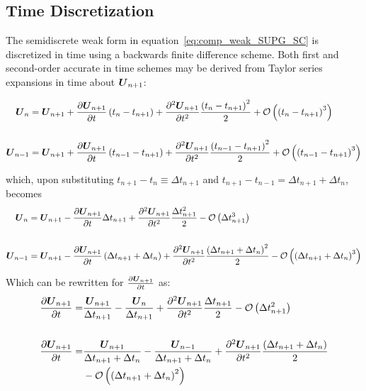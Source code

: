 \documentclass[compress,11pt]{beamer}
\begin{document}
\subsection{Time Discretization}
\frame
{
  \scriptsize
  The semidiscrete weak form in equation~\eqref{eq:comp_weak_SUPG_SC} is discretized in time using a backwards finite difference scheme.  Both first and second-order accurate in time schemes may be derived from Taylor series expansions in time about ${\boldsymbol{U}}_{n+1}$:
  
  {
    \begin{align}
      {\boldsymbol{U}}_n     = {\boldsymbol{U}}_{n+1} &+ {\frac{\partial{{\boldsymbol{U}}_{n+1}}}{\partial{t}}}\left(t_n-t_{n+1}\right) + {\frac{{\partial}^2{{\boldsymbol{U}}_{n+1}}}{\partial{t}^2}}\frac{\left(t_n-t_{n+1}\right)^2}{2} + \mathcal{O}\left(\left(t_n-t_{n+1}\right)^3\right) \nonumber \\
      & \nonumber \\
      {\boldsymbol{U}}_{n-1} = {\boldsymbol{U}}_{n+1} &+ {\frac{\partial{{\boldsymbol{U}}_{n+1}}}{\partial{t}}}\left(t_{n-1}-t_{n+1}\right) + {\frac{{\partial}^2{{\boldsymbol{U}}_{n+1}}}{\partial{t}^2}}\frac{\left(t_{n-1}-t_{n+1}\right)^2}{2} \nonumber + \mathcal{O}\left(\left(t_{n-1}-t_{n+1}\right)^3\right) \nonumber
    \end{align}
  }
      
  {
    which, upon substituting $t_{n+1} - t_n\equiv\Delta t_{n+1}$ and $t_{n+1} - t_{n-1}=\Delta t_{n+1} + \Delta t_n$, becomes
    \begin{align}
      {\boldsymbol{U}}_n     = {\boldsymbol{U}}_{n+1} &- {\frac{\partial{{\boldsymbol{U}}_{n+1}}}{\partial{t}}}\Delta t_{n+1} + {\frac{{\partial}^2{{\boldsymbol{U}}_{n+1}}}{\partial{t}^2}}\frac{\Delta t_{n+1}^2}{2} - \mathcal{O}\left(\Delta t_{n+1}^3\right) \nonumber \\ 
      & \nonumber \\
      {\boldsymbol{U}}_{n-1} = {\boldsymbol{U}}_{n+1} &- {\frac{\partial{{\boldsymbol{U}}_{n+1}}}{\partial{t}}}\left(\Delta t_{n+1}+\Delta t_n\right) + {\frac{{\partial}^2{{\boldsymbol{U}}_{n+1}}}{\partial{t}^2}}\frac{\left(\Delta t_{n+1}+\Delta t_n\right)^2}{2} - \mathcal{O}\left(\left(\Delta t_{n+1}+\Delta t_n\right)^3\right) \nonumber
    \end{align}
  }
}

\frame
{
  \small
  Which can be rewritten for ${\frac{\partial{{\boldsymbol{U}}_{n+1}}}{\partial{t}}}$ as:
  \scriptsize
  \begin{align}
    {\frac{\partial{{\boldsymbol{U}}_{n+1}}}{\partial{t}}} = &\frac{{\boldsymbol{U}}_{n+1}}{\Delta t_{n+1}} - \frac{{\boldsymbol{U}}_n}{\Delta t_{n+1}} + {\frac{{\partial}^2{{\boldsymbol{U}}_{n+1}}}{\partial{t}^2}} \frac{\Delta t_{n+1}}{2}
    - \mathcal{O}\left(\Delta t_{n+1}^2\right) \label{eq:udot,un} \\
    & \nonumber \\
    {\frac{\partial{{\boldsymbol{U}}_{n+1}}}{\partial{t}}} = &\frac{{\boldsymbol{U}}_{n+1}}{\Delta t_{n+1} + \Delta t_n} - \frac{{\boldsymbol{U}}_{n-1}}{\Delta t_{n+1} + \Delta t_n} + {\frac{{\partial}^2{{\boldsymbol{U}}_{n+1}}}{\partial{t}^2}}\frac{\left(\Delta t_{n+1} + \Delta t_n\right)}{2} \nonumber \\
    &- \mathcal{O}\left(\left(\Delta t_{n+1} + \Delta t_n\right)^2\right) \label{eq:udot,unm1}
  \end{align}
}
\end{document}
